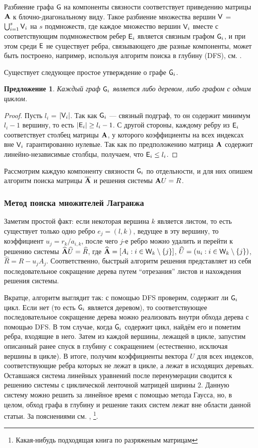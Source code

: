 \documentclass[10pt]{article}
\newtheorem{proposition}{Предложение}
\begin{document}
Разбиение графа $\mathsf{G}$ на компоненты связности соответствует приведению матрицы $\mathbf{A}$ к блочно-диагональному виду. Такое разбиение множества вершин $\mathsf{V}$ = $\bigcup_{i=1}^{s} \mathsf{V}_i$ на $s$ подмножеств, где каждое множество вершин $\mathsf{V}_i$ вместе с соответствующим подмножеством ребер $\mathsf{E}_i$ является связным графом $\mathsf{G}_i$, и при этом среди $\mathsf{E}$ не существует ребра, связывающего две разные компоненты, может быть построено, например, используя алгоритм поиска в глубину (DFS), см. \cite{cormen2009introduction}.

Существует следующее простое утверждение о графе $\mathsf{G}_i$.
\begin{proposition}
Каждый граф $\mathsf{G}_i$ является либо деревом, либо графом с одним циклом.
\end{proposition}
\begin{proof}
Пусть $l_i$ = $|\mathsf{V}_i|$. Так как $\mathsf{G}_i$ --- связный подграф, то он содержит минимум $l_i - 1$ вершину, то есть $|\mathsf{E}_i| \ge l_i - 1$. С другой стороны, каждому ребру из $\mathsf{E}_i$ соответствует столбец матрицы $\mathbf{A}$, у которого коэффициенты на всех индексах вне $\mathsf{V}_i$ гарантированно нулевые. Так как по предположению матрица $\mathbf{A}$ содержит линейно-независимые столбцы, получаем, что $\mathsf{E}_i \le l_i$.
\end{proof}

Рассмотрим каждую компоненту связности $\mathsf{G}_i$ по отдельности, и для них опишем алгоритм поиска матрицы $\overline {\mathbf{A}}$ и решения системы $\mathbf{A} U = R$.
\subsubsection{Метод поиска множителей Лагранжа}
Заметим простой факт: если некоторая вершина $k$ является листом, то есть существует только одно ребро $e_j = (l, k)$, ведущее в эту вершину, то коэффициент $u_j = r_k / a_{i, k}$, после чего $j$-е ребро можно удалить и перейти к решению системы $\widehat {\mathbf{A}} \widehat U = \widehat R$, где $\widehat {\mathbf{A}} = [A_i : i \in \mathsf{W}_k \setminus \{j \}]$, $\widehat U = (u_i : i \in \mathsf{W}_k \setminus \{j \})$, $\widehat R = R - u_j A_j$. Соответственно, быстрый алгоритм решения представляет из себя последовательное сокращение дерева путем ``отрезания'' листов и нахождения решения системы.

Вкратце, алгоритм выглядит так: с помощью DFS проверим, содержит ли $\mathsf{G}_i$ цикл. Если нет (то есть $\mathsf{G}_i$ является деревом), то соответствующее последовательное сокращение дерева можно реализовать внутри обхода дерева с помощью DFS. В том случае, когда $\mathsf{G}_i$ содержит цикл, найдём его и пометим ребра, входящие в него. Затем из каждой вершины, лежащей в цикле, запустим описанный ранее спуск в глубину с сокращением (естественно, исключая вершины в цикле). В итоге, получим коэффициенты вектора $U$ для всех индексов, соответствующие ребра которых не лежат в цикле, а лежат в исходящих деревьях. Оставшаяся система линейных уравнений после перенумерации сводится к решению системы с циклической ленточной матрицей ширины $2$. Данную систему можно решить за линейное время с помощью метода Гаусса, но, в целом, обход графа в глубину и решение таких систем лежат вне области данной статьи. За пояснениями см. \cite{cormen2009introduction}, \footnote{Какая-нибудь подходящая книга по разряженым матрицам}.
\end{document}
